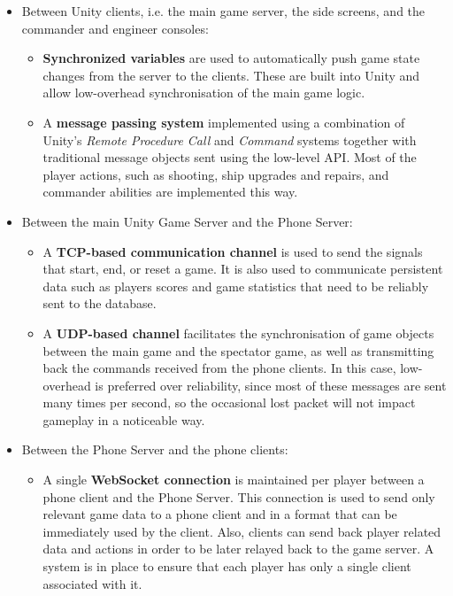 \documentclass[a4paper,11pt]{article}
\begin{document}
\begin{itemize}
	\item Between Unity clients, i.e. the main game server, the side screens, and the commander and engineer consoles:
    
	\begin{itemize}[topsep=0ex]
      \item \textbf{Synchronized variables} are used to automatically push game state changes from the server to the clients. These are built into Unity and allow low-overhead synchronisation of the main game logic.
      \item A \textbf{message passing system} implemented using a combination of Unity’s  \emph{Remote Procedure Call} and \emph{Command} systems together with traditional message objects sent using the low-level API. Most of the player actions, such as shooting, ship upgrades and repairs, and commander abilities are implemented this way.
  	\end{itemize}
    
	\item Between the main Unity Game Server and the Phone Server:
    
  \begin{itemize}[topsep=0ex]
 	 \item A \textbf{TCP-based communication channel} is used to send the signals that start, end, or reset a game. It is also used to communicate persistent data such as players scores and game statistics that need to be reliably sent to the database.
 	 \item A \textbf{UDP-based channel} facilitates the synchronisation of game objects between the main game and the spectator game, as well as transmitting back the commands received from the phone clients. In this case, low-overhead is preferred over reliability, since most of these messages are sent many times per second, so the occasional lost packet will not impact gameplay in a noticeable way.
  \end{itemize}
  
\item Between the Phone Server and the phone clients:

  \begin{itemize}[topsep=0ex]
  	\item A single \textbf{WebSocket connection} is maintained per player between a phone client and the Phone Server. This connection is used to send only relevant game data to a phone client and in a format that can be immediately used by the client. Also, clients can send back player related data and actions in order to be later relayed back to the game server. A system is in place to ensure that each player has only a single client associated with it.
  \end{itemize}
  
\end{itemize}
\end{document}
